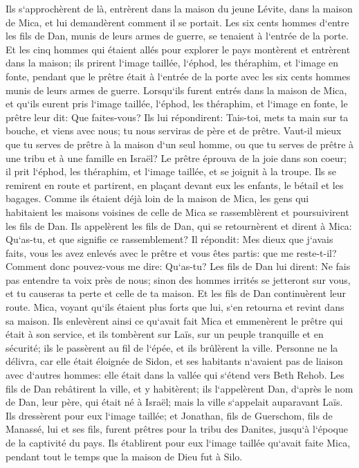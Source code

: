 \verse Ils s`approchèrent de là, entrèrent dans la maison du jeune Lévite, dans la maison de Mica, et lui demandèrent comment il se portait. 
\verse Les six cents hommes d`entre les fils de Dan, munis de leurs armes de guerre, se tenaient à l`entrée de la porte. 
\verse Et les cinq hommes qui étaient allés pour explorer le pays montèrent et entrèrent dans la maison; ils prirent l`image taillée, l`éphod, les théraphim, et l`image en fonte, pendant que le prêtre était à l`entrée de la porte avec les six cents hommes munis de leurs armes de guerre. 
\verse Lorsqu`ils furent entrés dans la maison de Mica, et qu`ils eurent pris l`image taillée, l`éphod, les théraphim, et l`image en fonte, le prêtre leur dit: Que faites-vous? 
\verse Ils lui répondirent: Tais-toi, mets ta main sur ta bouche, et viens avec nous; tu nous serviras de père et de prêtre. Vaut-il mieux que tu serves de prêtre à la maison d`un seul homme, ou que tu serves de prêtre à une tribu et à une famille en Israël? 
\verse Le prêtre éprouva de la joie dans son coeur; il prit l`éphod, les théraphim, et l`image taillée, et se joignit à la troupe. 
\verse Ils se remirent en route et partirent, en plaçant devant eux les enfants, le bétail et les bagages. 
\verse Comme ils étaient déjà loin de la maison de Mica, les gens qui habitaient les maisons voisines de celle de Mica se rassemblèrent et poursuivirent les fils de Dan. 
\verse Ils appelèrent les fils de Dan, qui se retournèrent et dirent à Mica: Qu`as-tu, et que signifie ce rassemblement? 
\verse Il répondit: Mes dieux que j`avais faits, vous les avez enlevés avec le prêtre et vous êtes partis: que me reste-t-il? Comment donc pouvez-vous me dire: Qu`as-tu? 
\verse Les fils de Dan lui dirent: Ne fais pas entendre ta voix près de nous; sinon des hommes irrités se jetteront sur vous, et tu causeras ta perte et celle de ta maison. 
\verse Et les fils de Dan continuèrent leur route. Mica, voyant qu`ils étaient plus forts que lui, s`en retourna et revint dans sa maison. 
\verse Ils enlevèrent ainsi ce qu`avait fait Mica et emmenèrent le prêtre qui était à son service, et ils tombèrent sur Laïs, sur un peuple tranquille et en sécurité; ils le passèrent au fil de l`épée, et ils brûlèrent la ville. 
\verse Personne ne la délivra, car elle était éloignée de Sidon, et ses habitants n`avaient pas de liaison avec d`autres hommes: elle était dans la vallée qui s`étend vers Beth Rehob. Les fils de Dan rebâtirent la ville, et y habitèrent; 
\verse ils l`appelèrent Dan, d`après le nom de Dan, leur père, qui était né à Israël; mais la ville s`appelait auparavant Laïs. 
\verse Ils dressèrent pour eux l`image taillée; et Jonathan, fils de Guerschom, fils de Manassé, lui et ses fils, furent prêtres pour la tribu des Danites, jusqu`à l`époque de la captivité du pays. 
\verse Ils établirent pour eux l`image taillée qu`avait faite Mica, pendant tout le temps que la maison de Dieu fut à Silo. 

